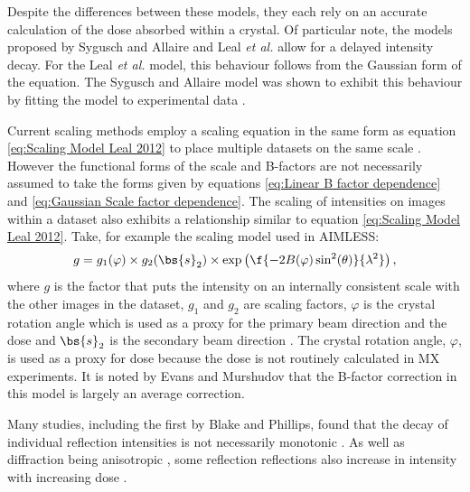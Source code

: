 		Despite the differences between these models, they each rely on an accurate calculation of the dose absorbed within a crystal.
		Of particular note, the models proposed by Sygusch and Allaire and Leal \textit{et al.} allow for a delayed intensity decay.
		For the Leal \textit{et al.} model, this behaviour follows from the Gaussian form of the equation.
		The Sygusch and Allaire model was shown to exhibit this behaviour by fitting the model to experimental data \cite{owen2014}.

		Current scaling methods employ a scaling equation in the same form as equation \ref{eq:Scaling Model Leal 2012} to place multiple datasets on the same scale \cite{kabsch2010integration}.
        However the functional forms of the scale and B-factors are not necessarily assumed to take the forms given by equations \ref{eq:Linear B factor dependence} and \ref{eq:Gaussian Scale factor dependence}.
		The scaling of intensities on images within a dataset also exhibits a relationship similar to equation \ref{eq:Scaling Model Leal 2012}. Take, for example the scaling model used in AIMLESS:
        \begin{equation}
            g = g_1(\varphi) \times g_2(\bs{s}_2) \times \exp \left(\f{-2B(\varphi)\sin^2(\theta)}{\lambda^2} \right),
        \end{equation}
		where $g$ is the factor that puts the intensity on an internally consistent scale with the other images in the dataset, $g_1$ and $g_2$ are scaling factors, $\varphi$ is the crystal rotation angle which is used as a proxy for the primary beam direction and the dose and $\bs{s}_2$ is the secondary beam direction \cite{evans2013}.
		The crystal rotation angle, $\varphi$, is used as a proxy for dose because the dose is not routinely calculated in MX experiments. It is noted by Evans and Murshudov that the B-factor correction in this model is largely an average correction.

		Many studies, including the first by Blake and Phillips, found that the decay of individual reflection intensities is not necessarily monotonic \cite{blake1962,hendrickson1973,hendrickson1976}.
		As well as diffraction being anisotropic \cite{abrahams1987anisotropy}, some reflection reflections also increase in intensity with increasing dose \cite{abrahams1973}.

